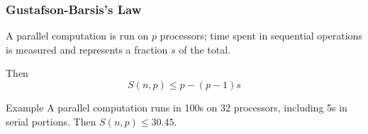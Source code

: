 \documentclass[xcolor={x11names,svgnames,psnames}]{beamer}
\begin{document}
\begin{frame}
  \frametitle{Gustafson-Barsis's Law}

  
  A parallel computation is run on \(p\) processors; time spent in sequential operations is measured and represents a fraction $s$ of the total.

  \medskip
  
  Then
  \[
    S(n, p) \leq  p - (p-1)s
  \]

    \medskip
  
    \begin{block}{Example}
      A parallel computation runs in 100s on 32 processors, including 5s in serial portions.
      Then $S(n, p) \leq 30.45$.
    \end{block}
  \end{frame}


\end{document}

